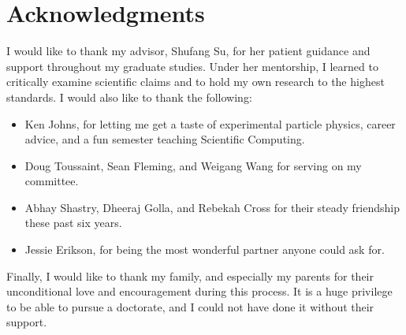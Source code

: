 \chapter*{Acknowledgments}

I would like to thank my advisor, Shufang Su, for her patient guidance and support throughout my graduate studies. Under her mentorship, I learned to critically examine scientific claims and to hold my own research to the highest standards. 
I would also like to thank the following:
\begin{itemize}
\item Ken Johns, for letting me get a taste of experimental particle physics, career advice, and a fun semester teaching Scientific Computing.
\item Doug Toussaint, Sean Fleming, and Weigang Wang for serving on my committee.
\item Abhay Shastry, Dheeraj Golla, and Rebekah Cross for their steady friendship these past six years.
\item Jessie Erikson, for being the most wonderful partner anyone could ask for.
\end{itemize}
Finally, I would like to thank my family, and especially my parents for their unconditional love and encouragement during this process. It is a huge privilege to be able to pursue a doctorate, and I could not have done it without their support.
